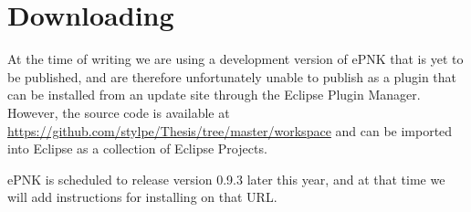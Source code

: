 \chapter{Downloading \thename{}}

At the time of writing we are using a development version of ePNK that is yet to
be published, and are therefore unfortunately unable to publish \thename{} as a
plugin that can be installed from an update site through the Eclipse Plugin Manager. However,
the source code is available at
\mbox{\url{https://github.com/stylpe/Thesis/tree/master/workspace}} and can be
imported into Eclipse as a collection of Eclipse Projects.

ePNK is scheduled to release version 0.9.3 later this year, and at that time we
will add instructions for installing \thename{} on that URL.